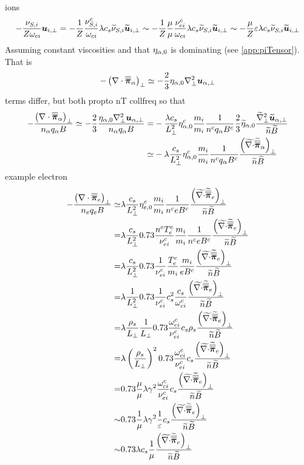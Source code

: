 %
ions
%
\begin{align*}
    -    \frac{ \nu_{S,i} }{Z\omega_{ci}}\boldsymbol{u}_{i,\perp}
=
-
\frac{1}{Z}
\frac{ \nu^c_{S,i}}{\omega_{ci}}\lambda c_s \widetilde{ \nu}_{S,i}\widetilde{ \boldsymbol{u}}_{i,\perp}
\sim
-
\frac{1}{Z}
\frac{\mu}{\mu}
\frac{ \nu^c_{ei}}{\omega_{ci}}\lambda c_s \widetilde{ \nu}_{S,i}\widetilde{ \boldsymbol{u}}_{i,\perp}
\sim
-
\frac{\mu}{Z}
\varepsilon\lambda c_s \widetilde{ \nu}_{S,i}\widetilde{ \boldsymbol{u}}_{i,\perp}
\end{align*}
%
Assuming constant viscosities and that $\eta_{\alpha,0}$ is dominating (see \cref{app:piTensor}).
That is
%
\begin{align*}
-  \left(\nabla\cdot\boldsymbol{\overline{\overline{\pi}}}_\alpha\right)_\perp \simeq
-  \frac{2}{3}\eta_{\alpha,0}\nabla_\perp^2\boldsymbol{u}_{\alpha,\perp}
\end{align*}
%
terms differ, but both propto nT collfreq
so that
%
\begin{align*}
- \frac{ \left(\nabla\cdot\boldsymbol{\overline{\overline{\pi}}}_\alpha\right)_\perp }{n_\alpha  q_\alpha B}
\simeq
- \frac{2}{3}\frac{ \eta_{\alpha,0}\nabla_\perp^2\boldsymbol{u}_{\alpha,\perp} }{n_\alpha  q_\alpha B}
=&
- \frac{\lambda c_s}{L_{\perp}^2}
\eta^c_{\alpha,0}
\frac{m_i}{m_i}
\frac{1}{n^c  q_\alpha B^c}
\frac{2}{3}
\widetilde{ \eta}_{\alpha,0}
\frac{ \widetilde{ \nabla}_\perp^2\widetilde{ \boldsymbol{u}}_{\alpha,\perp} }{\widetilde{ n}\widetilde{ B}}
\\
\simeq&
-
\lambda
\frac{c_s}{L_{\perp}^2}
\eta^c_{\alpha,0}
\frac{m_i}{m_i}
\frac{1}{n^c  q_\alpha B^c}
\frac{\left(\widetilde{ \nabla\cdot}\widetilde{ \boldsymbol{\overline{\overline{\pi}}}}_\alpha\right)_\perp}{\widetilde{ n}\widetilde{ B}}
\end{align*}
%
example electron
%
\begin{align*}
- \frac{ \left(\nabla\cdot\boldsymbol{\overline{\overline{\pi}}}_e\right)_\perp }{n_e  q_e B}
\simeq&
\lambda
\frac{c_s}{L_{\perp}^2}
\eta^c_{e,0}
\frac{m_i}{m_i}
\frac{1}{n^c  e B^c}
\frac{\left(\widetilde{ \nabla\cdot}\widetilde{ \boldsymbol{\overline{\overline{\pi}}}}_e\right)_\perp}{\widetilde{ n}\widetilde{ B}}
\\
=&
\lambda
\frac{c_s}{L_{\perp}^2}
0.73\frac{n^cT_e^c}{\nu^c_{ei}}
\frac{m_i}{m_i}
\frac{1}{n^c  e B^c}
\frac{\left(\widetilde{ \nabla\cdot}\widetilde{ \boldsymbol{\overline{\overline{\pi}}}}_e\right)_\perp}{\widetilde{ n}\widetilde{ B}}
\\
=&
\lambda
\frac{c_s}{L_{\perp}^2}
0.73\frac{1}{\nu^c_{ei}}
\frac{T_e^c}{m_i}
\frac{m_i}{ e B^c}
\frac{\left(\widetilde{ \nabla\cdot}\widetilde{ \boldsymbol{\overline{\overline{\pi}}}}_e\right)_\perp}{\widetilde{ n}\widetilde{ B}}
\\
=&
\lambda
\frac{1}{L_{\perp}^2}
0.73\frac{1}{\nu^c_{ei}}
c_s^2
\frac{c_s}{\omega^c_{ci}}
\frac{\left(\widetilde{ \nabla\cdot}\widetilde{ \boldsymbol{\overline{\overline{\pi}}}}_e\right)_\perp}{\widetilde{ n}\widetilde{ B}}
\\
=&
\lambda
\frac{\rho_s}{L_{\perp}}
\frac{1}{L_{\perp}}
0.73\frac{\omega^c_{ci}}{\nu^c_{ei}}
c_s\rho_s
\frac{\left(\widetilde{ \nabla\cdot}\widetilde{ \boldsymbol{\overline{\overline{\pi}}}}_e\right)_\perp}{\widetilde{ n}\widetilde{ B}}
\\
=&
\lambda
\left(\frac{\rho_s}{L_{\perp}}\right)^2
0.73\frac{\omega^c_{ci}}{\nu^c_{ei}}
c_s
\frac{\left(\widetilde{ \nabla\cdot}\widetilde{ \boldsymbol{\overline{\overline{\pi}}}}_e\right)_\perp}{\widetilde{ n}\widetilde{ B}}
\\
=&
0.73
\frac{\mu}{\mu}
\lambda
\gamma^2
\frac{\omega^c_{ci}}{\nu^c_{ei}}
c_s
\frac{\left(\widetilde{ \nabla\cdot}\widetilde{ \boldsymbol{\overline{\overline{\pi}}}}_e\right)_\perp}{\widetilde{ n}\widetilde{ B}}
\\
\sim&
0.73
\frac{1}{\mu}
\lambda
\gamma^2
\frac{1}{\varepsilon}
c_s
\frac{\left(\widetilde{ \nabla\cdot}\widetilde{ \boldsymbol{\overline{\overline{\pi}}}}_e\right)_\perp}{\widetilde{ n}\widetilde{ B}}
\\
\sim&
0.73
\lambda
c_s
\frac{1}{\mu}
\frac{\left(\widetilde{ \nabla\cdot}\widetilde{ \boldsymbol{\overline{\overline{\pi}}}}_e\right)_\perp}{\widetilde{ n}\widetilde{ B}}
\end{align*}
